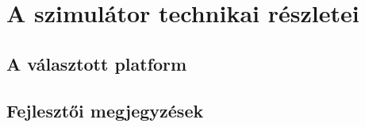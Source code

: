   \section{A szimulátor technikai részletei}
    \subsection{A választott platform}
    \subsection{Fejlesztői megjegyzések}
